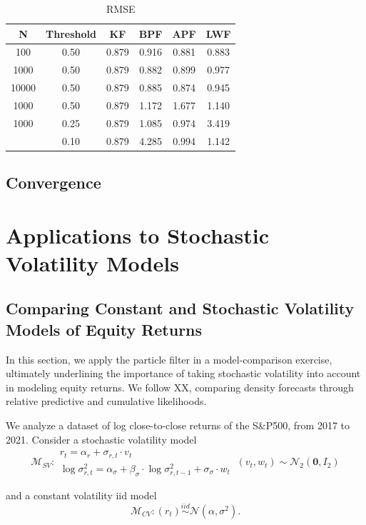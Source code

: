 \documentclass[
]{book}
\theoremstyle{break}
\theoremstyle{nonumberplain}
\begin{document}
\begin{longtable}[t]{cccccc}
\caption{\label{tab:unnamed-chunk-37}RMSE}\\
\toprule
N & Threshold & KF & BPF & APF & LWF\\
\midrule
100 & 0.50 & 0.879 & 0.916 & 0.881 & 0.883\\
1000 & 0.50 & 0.879 & 0.882 & 0.899 & 0.977\\
10000 & 0.50 & 0.879 & 0.885 & 0.874 & 0.945\\
1000 & 0.50 & 0.879 & 1.172 & 1.677 & 1.140\\
1000 & 0.25 & 0.879 & 1.085 & 0.974 & 3.419\\
\addlinespace
1000 & 0.10 & 0.879 & 4.285 & 0.994 & 1.142\\
\bottomrule
\end{longtable}

\section{Convergence}\label{pf_converg}

\chapter{Applications to Stochastic Volatility Models}
\section{Comparing Constant and Stochastic Volatility Models of Equity Returns}

In this section, we apply the particle filter in a model-comparison
exercise, ultimately underlining the importance of taking stochastic
volatility into account in modeling equity returns. We follow XX,
comparing density forecasts through relative predictive and cumulative
likelihoods.

We analyze a dataset of log close-to-close returns of the S\&P500, from
2017 to 2021. Consider a stochastic volatility model \[
\mathcal{M}_{SV}:\begin{array}{lc}
r_{t}=\alpha_{r}+\sigma_{r,t}\cdot v_{t}\\
\log\sigma_{r,t}^{2}=\alpha_{\sigma}+\beta_{\sigma}\cdot\log\sigma_{r,t-1}^{2}+\sigma_{\sigma}\cdot w_{t}
\end{array}\ (v_{t},w_{t})\sim\mathcal{N}_{2}(\boldsymbol{0},I_{2})
\]

and a constant volatility iid model \[
\mathcal{M}_{CV}:(r_{t})\overset{iid}{\sim}\mathcal{N}(\alpha,\sigma^{2}).
\]
\end{document}
